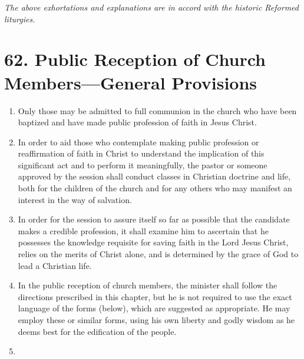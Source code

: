 \documentclass[
]{book}
\providecommand{\tightlist}{%
  \setlength{\itemsep}{0pt}\setlength{\parskip}{0pt}}
\begin{document}
\emph{The above exhortations and explanations are in accord with the historic Reformed liturgies.}

\hypertarget{public-reception-of-church-membersgeneral-provisions}{%
\section*{62. Public Reception of Church Members---General Provisions}\label{public-reception-of-church-membersgeneral-provisions}}

\protect\hypertarget{chapter-slug-62-public-reception-of-church-members-general-provisions}{\href{}{}}

\begin{enumerate}
\def\labelenumi{\arabic{enumi}.}
\tightlist
\item
  \protect\hypertarget{62}{\href{}{}}Only those may be admitted to full communion in the church who have been baptized and have made public profession of faith in Jesus Christ.
\item
  In order to aid those who contemplate making public profession or reaffirmation of faith in Christ to understand the implication of this significant act and to perform it meaningfully, the pastor or someone approved by the session shall conduct classes in Christian doctrine and life, both for the children of the church and for any others who may manifest an interest in the way of salvation.
\item
  \protect\hypertarget{62.3}{\href{}{}}In order for the session to assure itself so far as possible that the candidate makes a credible profession, it shall examine him to ascertain that he possesses the knowledge requisite for saving faith in the Lord Jesus Christ, relies on the merits of Christ alone, and is determined by the grace of God to lead a Christian life.
\item
  In the public reception of church members, the minister shall follow the directions prescribed in this chapter, but he is not required to use the exact language of the forms (below), which are suggested as appropriate. He may employ these or similar forms, using his own liberty and godly wisdom as he deems best for the edification of the people.
\item

\end{enumerate}
\end{document}
